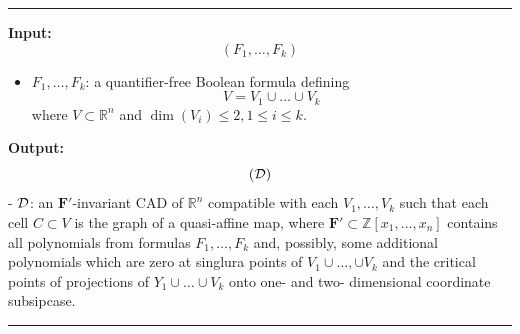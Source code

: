 \documentclass[
]{book}
\providecommand{\tightlist}{%
  \setlength{\itemsep}{0pt}\setlength{\parskip}{0pt}}
\theoremstyle{definition}
\theoremstyle{definition}
\theoremstyle{definition}
\theoremstyle{definition}
\theoremstyle{remark}
\begin{document}
\begin{center}\rule{0.5\linewidth}{0.5pt}\end{center}

\textbf{Input:}
\[(F_1,\ldots,F_k)\]

\begin{itemize}
\tightlist
\item
  \(F_1,\ldots,F_k\): a quantifier-free Boolean formula defining
  \[
    V = V_1 \cup \ldots \cup V_k
    \]
  where \(V \subset \mathbb{R}^n\) and \(\dim(V_i) \le 2, 1 \le i \le k\).
\end{itemize}

\textbf{Output:}
\[
({\cal D})
\]
- \(\cal D\): an \(\mathbf{F'}\)-invariant CAD of \(\mathbb{R}^n\) compatible with each \(V_1,\ldots,V_k\) such that each cell \(C \subset V\) is the graph of a quasi-affine map, where \(\mathbf{F'} \subset \mathbb{Z}[x_1,\ldots,x_n]\) contains all polynomials from formulas \(F_1,\ldots,F_k\) and, possibly, some additional polynomials which are zero at singlura points of \(V_1\cup \ldots, \cup V_k\) and the critical points of projections of \(Y_1 \cup \ldots \cup V_k\) onto one- and two- dimensional coordinate subsipcase.

\begin{center}\rule{0.5\linewidth}{0.5pt}\end{center}
\end{document}

